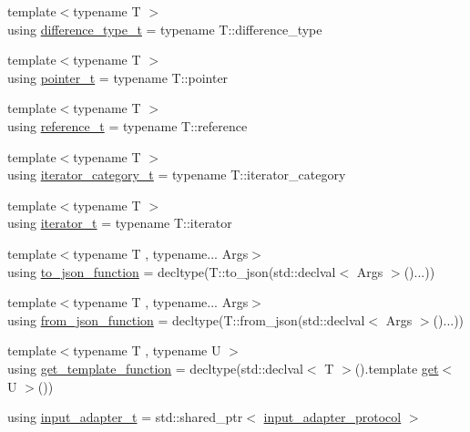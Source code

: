 \begin{DoxyCompactItemize}
\item 
{\footnotesize template$<$typename T $>$ }\\using \mbox{\hyperlink{namespacenlohmann_1_1detail_a3603b59a17d1c5e15050743b847992f2}{difference\+\_\+type\+\_\+t}} = typename T\+::difference\+\_\+type
\item 
{\footnotesize template$<$typename T $>$ }\\using \mbox{\hyperlink{namespacenlohmann_1_1detail_a26dc71e2dd9336587e56062178f9abce}{pointer\+\_\+t}} = typename T\+::pointer
\item 
{\footnotesize template$<$typename T $>$ }\\using \mbox{\hyperlink{namespacenlohmann_1_1detail_a082bdafd3b4c61d9d1e92b35b8f75ee3}{reference\+\_\+t}} = typename T\+::reference
\item 
{\footnotesize template$<$typename T $>$ }\\using \mbox{\hyperlink{namespacenlohmann_1_1detail_ad22d2aa3aab018050ae519f6754366e1}{iterator\+\_\+category\+\_\+t}} = typename T\+::iterator\+\_\+category
\item 
{\footnotesize template$<$typename T $>$ }\\using \mbox{\hyperlink{namespacenlohmann_1_1detail_a9ff93db146174305bce1bc4c54703e11}{iterator\+\_\+t}} = typename T\+::iterator
\item 
{\footnotesize template$<$typename T , typename... Args$>$ }\\using \mbox{\hyperlink{namespacenlohmann_1_1detail_af846b6cf2f926009ff3a7a61495ca383}{to\+\_\+json\+\_\+function}} = decltype(T\+::to\+\_\+json(std\+::declval$<$ Args $>$()...))
\item 
{\footnotesize template$<$typename T , typename... Args$>$ }\\using \mbox{\hyperlink{namespacenlohmann_1_1detail_a1711ee5cef66a0523055c8d9f024f322}{from\+\_\+json\+\_\+function}} = decltype(T\+::from\+\_\+json(std\+::declval$<$ Args $>$()...))
\item 
{\footnotesize template$<$typename T , typename U $>$ }\\using \mbox{\hyperlink{namespacenlohmann_1_1detail_ab4d22cdb6521ee3508db496dea66711e}{get\+\_\+template\+\_\+function}} = decltype(std\+::declval$<$ T $>$().template \mbox{\hyperlink{namespacenlohmann_1_1detail_acc422c11342b31368f610b6f96fcedc6}{get}}$<$ U $>$())
\item 
using \mbox{\hyperlink{namespacenlohmann_1_1detail_ae132f8cd5bb24c5e9b40ad0eafedf1c2}{input\+\_\+adapter\+\_\+t}} = std\+::shared\+\_\+ptr$<$ \mbox{\hyperlink{structnlohmann_1_1detail_1_1input__adapter__protocol}{input\+\_\+adapter\+\_\+protocol}} $>$

\end{DoxyCompactItemize}
